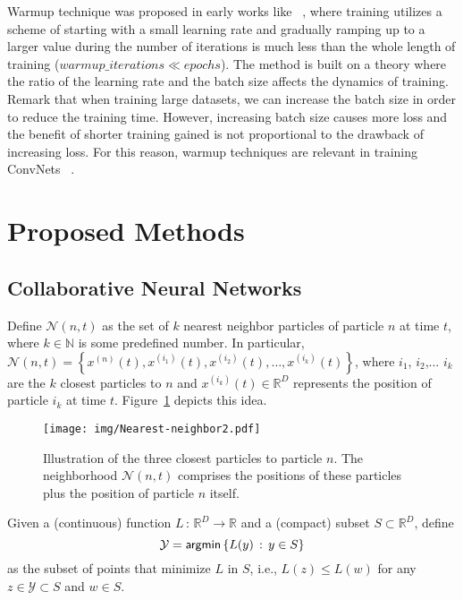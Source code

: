 \documentclass{ieeeaccess}
\begin{document}
Warmup technique was proposed in early works like ~\cite{vaswani2017attention}, where training utilizes a scheme of starting with a small learning rate and gradually ramping up to a larger value during the number of iterations is much less than the whole length of training ($warmup\_iterations \ll epochs$). The method is built on a theory where the ratio of the learning rate and the batch size affects the dynamics of training. Remark that when training large datasets, we can increase the batch size in order to reduce the training time. However, increasing batch size causes more loss and the benefit of shorter training gained is not proportional to the drawback of increasing loss. For this reason, warmup techniques are relevant in training ConvNets ~\cite{vaswani2017attention,goyal2017accurate,gotmare2018closer,liu2019variance}.
\section{Proposed Methods}
\label{sec:proposed}
\subsection{Collaborative Neural Networks}
\label{sec:collab}
Define $\mathcal{N}(n,t)$ as the set of $k$ nearest neighbor particles of particle $n$ at time $t$, where $k\in\mathbb{N}$ is some predefined number. In particular, $\mathcal{N}(n,t)=\left\{x^{(n)}(t),x^{(i_1)}(t),x^{(i_2)}(t),\ldots,x^{(i_k)}(t)\right\}$, where $i_1$, $i_2$,... $i_k$ are the $k$ closest particles to $n$ and $x^{(i_k)}(t)\in \mathbb{R}^D$ represents the position of particle $i_k$ at time $t$. Figure~\ref{fig:nn} depicts this idea.
\begin{figure} [htbp!]
\begin{center}
\texttt{[image: img/Nearest-neighbor2.pdf]}
\caption{Illustration of the three closest particles to particle $n$. The neighborhood $\mathcal{N}(n,t)$ comprises the positions of these particles plus the position of particle $n$ itself.}\label{fig:nn}
\end{center}
\end{figure}
Given a (continuous) function $L\,:\,\mathbb{R}^D\longrightarrow \mathbb{R}$ and a (compact) subset $S\subset \mathbb{R}^D$, define
\begin{equation}
\mathcal{Y}={\sf argmin}\left\{L(y)\,:\,y\in S\right\}
\end{equation}
as the subset of points that minimize $L$ in $S$, i.e., $L(z)\leq L(w)$ for any $z\in \mathcal{Y}\subset S$ and $w\in S$.
\end{document}
